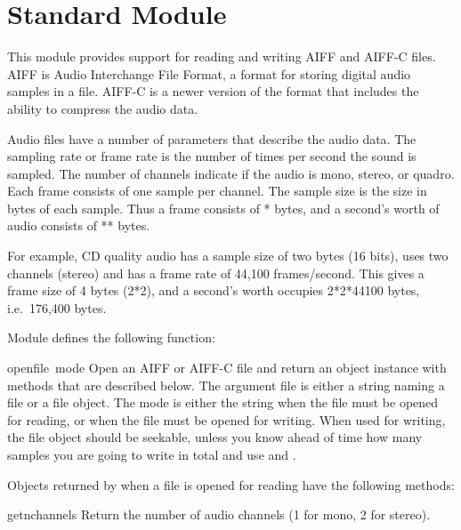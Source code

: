 \section{Standard Module }

This module provides support for reading and writing AIFF and AIFF-C
files.  AIFF is Audio Interchange File Format, a format for storing
digital audio samples in a file.  AIFF-C is a newer version of the
format that includes the ability to compress the audio data.

Audio files have a number of parameters that describe the audio data.
The sampling rate or frame rate is the number of times per second the
sound is sampled.  The number of channels indicate if the audio is
mono, stereo, or quadro.  Each frame consists of one sample per
channel.  The sample size is the size in bytes of each sample.  Thus a
frame consists of * bytes, and a
second's worth of audio consists of
** bytes.

For example, CD quality audio has a sample size of two bytes (16
bits), uses two channels (stereo) and has a frame rate of 44,100
frames/second.  This gives a frame size of 4 bytes (2*2), and a
second's worth occupies 2*2*44100 bytes, i.e.\ 176,400 bytes.

Module  defines the following function:

\renewcommand{\indexsubitem}{(in module aifc)}
\begin{funcdesc}{open}{file\, mode}
Open an AIFF or AIFF-C file and return an object instance with
methods that are described below.  The argument file is either a
string naming a file or a file object.  The mode is either the string
 when the file must be opened for reading, or 
when the file must be opened for writing.  When used for writing, the
file object should be seekable, unless you know ahead of time how many
samples you are going to write in total and use
 and .
\end{funcdesc}

Objects returned by  when a file is opened for
reading have the following methods:

\renewcommand{\indexsubitem}{(aifc object method)}
\begin{funcdesc}{getnchannels}{}
Return the number of audio channels (1 for mono, 2 for stereo).
\end{funcdesc}

